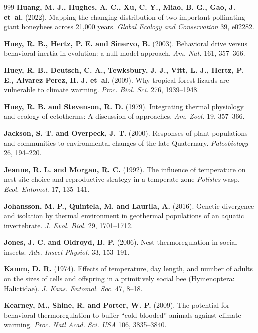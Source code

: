 \documentclass[11pt,a4paper]{article}
\begin{document}
\begin{thebibliography}{999}
\textbf{Huang, M. J., Hughes, A. C., Xu, C. Y., Miao, B. G., Gao, J. et~al.} (2022).
Mapping the changing distribution of two important pollinating giant honeybees across 21,000 years.
\textit{Global Ecology and Conservation} 39, e02282.

\textbf{Huey, R. B., Hertz, P. E. and Sinervo, B.} (2003).
Behavioral drive versus behavioral inertia in evolution: a null model approach.
\textit{Am. Nat.} 161, 357--366.

\textbf{Huey, R. B., Deutsch, C. A., Tewksbury, J. J., Vitt, L. J., Hertz, P. E., Alvarez Perez, H. J. et~al.} (2009).
Why tropical forest lizards are vulnerable to climate warming.
\textit{Proc. Biol. Sci.} 276, 1939--1948.

\textbf{Huey, R. B. and Stevenson, R. D.} (1979).
Integrating thermal physiology and ecology of ectotherms: A discussion of approaches.
\textit{Am. Zool.} 19, 357--366.

\textbf{Jackson, S. T. and Overpeck, J. T.} (2000).
Responses of plant populations and communities to environmental changes of the late Quaternary.
\textit{Paleobiology} 26, 194--220.

\textbf{Jeanne, R. L. and Morgan, R. C.} (1992).
The influence of temperature on nest site choice and reproductive strategy in a temperate zone \textit{Polistes} wasp.
\textit{Ecol. Entomol.} 17, 135--141.

\textbf{Johansson, M. P., Quintela, M. and Laurila, A.} (2016).
Genetic divergence and isolation by thermal environment in geothermal populations of an aquatic invertebrate.
\textit{J. Evol. Biol.} 29, 1701--1712.

\textbf{Jones, J. C. and Oldroyd, B. P.} (2006).
Nest thermoregulation in social insects.
\textit{Adv. Insect Physiol.} 33, 153--191.

\textbf{Kamm, D. R.} (1974). Effects of temperature, day length, and number of adults on the sizes of cells and offspring in a primitively social bee (Hymenoptera: Halictidae). \textit{J. Kans. Entomol. Soc.} 47, 8--18.

\textbf{Kearney, M., Shine, R. and Porter, W. P.} (2009).
The potential for behavioral thermoregulation to buffer “cold-blooded” animals against climate warming.
\textit{Proc. Natl Acad. Sci. USA} 106, 3835--3840.


\end{thebibliography}
\end{document}
